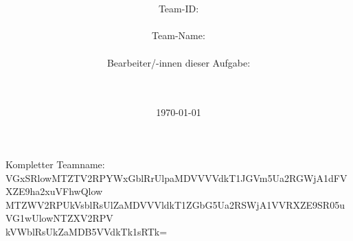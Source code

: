 \documentclass[a4paper,10pt,ngerman]{scrartcl}
\title{\textbf{\Huge\Aufgabe}}
\author{\LARGE Team-ID: \LARGE \TeamId \\\\
	    \LARGE Team-Name: \LARGE \TeamName \\\\
	    \LARGE Bearbeiter/-innen dieser Aufgabe: \\ 
	    \LARGE \Namen\\\\}
\date{\LARGE\today}
\begin{document}
\maketitle
\tableofcontents
\vspace*{\fill}
\begin{flushleft}
Kompletter Teamname:\\
VGxSRlowMTZTV2RPYWxGblRrUlpaMDVVVVdkT1JGVm5Ua2RGWjA1dFVXZE9ha2xuVFhwQlow\\
MTZWV2RPUkVsblRsUlZaMDVVVldkT1ZGbG5Ua2RSWjA1VVRXZE9SR05uVG1wUlowNTZXV2RPV\\
kVWblRsUkZaMDB5VVdkTk1sRTk= 
\end{flushleft}

\vspace{0.5cm}





\end{document}
